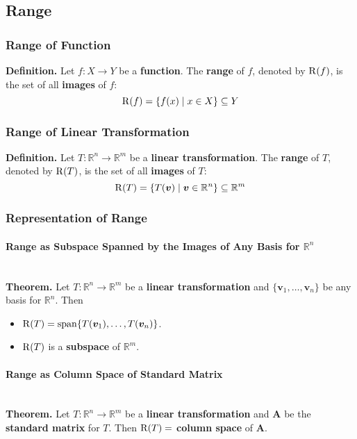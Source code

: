 \documentclass[../ma2001_notes.tex]{subfiles}
\begin{document}
\subsection{Range}
\subsubsection{Range of Function}
\textbf{Definition.} Let \(f:X\to Y\) be a \textbf{function}. The \textbf{range} of \(f\), denoted by \(\operatorname{R}(f)\), is the set of all \textbf{images} of \(f\):
\[\operatorname{R}(f)=\{f(x)\mid x\in X\}\subseteq Y\]

\subsubsection{Range of Linear Transformation}
\textbf{Definition.} Let \(T:\mathbb{R}^n\to\mathbb{R}^m\) be a \textbf{linear transformation}. The \textbf{range} of \(T\), denoted by \(\operatorname{R}(T)\), is the set of all \textbf{images} of \(T\):
\[\operatorname{R}(T)=\{T(\bm{v})\mid\bm{v}\in\mathbb{R}^n\}\subseteq\mathbb{R}^m\]

\subsubsection{Representation of Range}
\paragraph{Range as Subspace Spanned by the Images of Any Basis for $\mathbb{R}^n$}\,\\
\textbf{Theorem.} Let \(T:\mathbb{R}^n\to\mathbb{R}^m\) be a \textbf{linear transformation} and \(\{\bm{v}_1,\ldots,\bm{v}_n\}\) be any basis for \(\mathbb{R}^n\). Then
\begin{itemize}
	\item\(\operatorname{R}(T)=\operatorname{span}\{T(\bm{v}_1),\ldots,T(\bm{v}_n)\}\).
	\item\(\operatorname{R}(T)\) is a \textbf{subspace} of \(\mathbb{R}^m\).
\end{itemize}

\paragraph{Range as Column Space of Standard Matrix}\,\\
\textbf{Theorem.} Let \(T:\mathbb{R}^n\to\mathbb{R}^m\) be a \textbf{linear transformation} and \(\bm{A}\) be the \textbf{standard matrix} for \(T\). Then \(\operatorname{R}(T)=\) \textbf{column space} of \(\bm{A}\).
\end{document}
